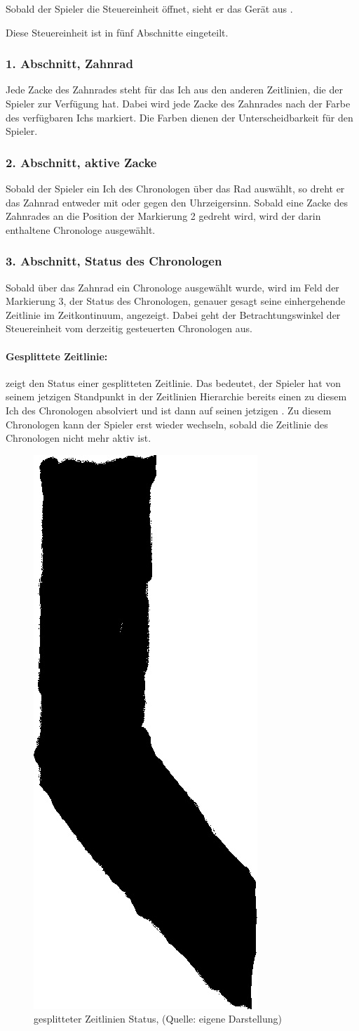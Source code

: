 Sobald der Spieler die Steuereinheit öffnet, sieht er das Gerät aus .

Diese Steuereinheit ist in fünf Abschnitte eingeteilt.

\subsubsection{1. Abschnitt, Zahnrad}
Jede Zacke des Zahnrades steht für das Ich aus den anderen Zeitlinien, die der Spieler zur Verfügung hat. Dabei wird jede Zacke des Zahnrades nach der Farbe des verfügbaren Ichs markiert. Die Farben dienen der Unterscheidbarkeit für den Spieler.
\subsubsection{2. Abschnitt, aktive Zacke}
Sobald der Spieler ein Ich des Chronologen über das Rad auswählt, so dreht er das Zahnrad entweder mit oder gegen den Uhrzeigersinn. Sobald eine Zacke des Zahnrades an die Position der Markierung 2 gedreht wird, wird der darin enthaltene Chronologe ausgewählt. 
\subsubsection{3. Abschnitt, Status des Chronologen}
Sobald über das Zahnrad ein Chronologe ausgewählt wurde, wird im Feld der Markierung 3, der Status des Chronologen, genauer gesagt seine einhergehende Zeitlinie im Zeitkontinuum, angezeigt. Dabei geht der Betrachtungswinkel der Steuereinheit vom derzeitig gesteuerten Chronologen aus.
\paragraph{Gesplittete Zeitlinie:}
 zeigt den Status einer gesplitteten Zeitlinie. Das bedeutet, der Spieler hat von seinem jetzigen Standpunkt in der Zeitlinien Hierarchie bereits einen  zu diesem Ich des Chronologen absolviert und ist dann auf seinen jetzigen . Zu diesem Chronologen kann der Spieler erst wieder wechseln, sobald die Zeitlinie des Chronologen nicht mehr aktiv ist.

\begin{figure}[ht]
\centering
\includegraphics[width=0.1\linewidth]{content/pictures/Splitet_icon_trnsp.jpg}
\caption{gesplitteter Zeitlinien Status, (Quelle: eigene Darstellung)}
\label{fig:split_status}
\end{figure}

